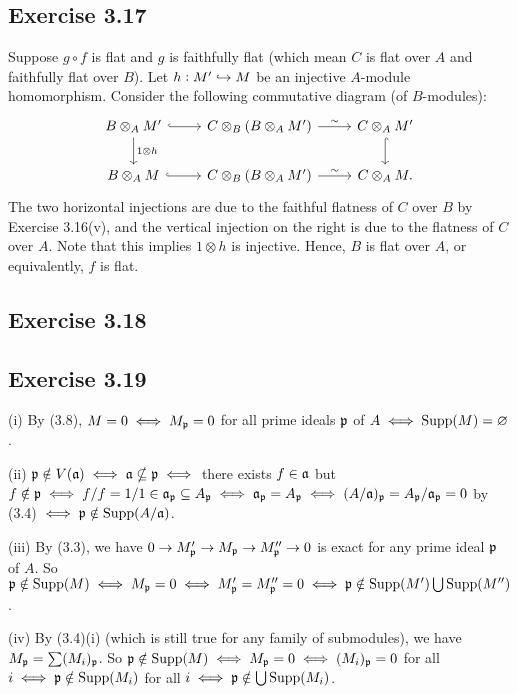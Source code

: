 \documentclass[../A&M.tex]{subfiles}
\begin{document}
\subsection*{Exercise 3.17}

Suppose $g\circ f$ is flat and $g$ is faithfully flat (which mean $C$ is flat over $A$ and faithfully flat over $B$). Let $h: M' \hookrightarrow M$ be an injective $A$-module homomorphism. Consider the following commutative diagram (of $B$-modules):
$$
\begin{tikzcd}
B \otimes_A M' \arrow[r, hook] \arrow[d, "1 \otimes h"] & C \otimes_B (B\otimes_A M') \hisoarrow{r} & C \otimes_A M' \arrow[d, hook] \\ 
B \otimes_A M \arrow[r, hook] & C \otimes_B (B\otimes_A M') \hisoarrow{r} & C \otimes_A M.
\end{tikzcd}
$$
The two horizontal injections are due to the faithful flatness of $C$ over $B$ by Exercise 3.16(v), and the vertical injection on the right is due to the flatness of $C$ over $A$. Note that this implies $1\otimes h$ is injective. Hence, $B$ is flat over $A$, or equivalently, $f$ is flat.

\subsection*{Exercise 3.18}

\subsection*{Exercise 3.19}

(i) By (3.8), $M=0 \iff M_{\mathfrak{p}} = 0$ for all prime ideals $\mathfrak{p}$ of $A \iff \operatorname{Supp}(M) = \varnothing$.

(ii) $\mathfrak{p} \notin V(\mathfrak{a}) \iff \mathfrak{a} \nsubseteq \mathfrak{p} \iff$ there exists $f \in \mathfrak{a}$ but $f \notin \mathfrak{p} \iff f/f = 1/1 \in \mathfrak{a}_{\mathfrak{p}} \subseteq A_{\mathfrak{p}}\iff \mathfrak{a}_{\mathfrak{p}} = A_{\mathfrak{p}} \iff (A/\mathfrak{a})_{\mathfrak{p}} = A_{\mathfrak{p}}/\mathfrak{a}_{\mathfrak{p}} = 0$ by (3.4) $\iff \mathfrak{p} \notin \operatorname{Supp}(A/\mathfrak{a})$.

(iii) By (3.3), we have $0 \to M'_{\mathfrak{p}} \to M_{\mathfrak{p}} \to M''_{\mathfrak{p}} \to 0$ is exact for any prime ideal $\mathfrak{p}$ of $A$. So $\mathfrak{p} \notin \operatorname{Supp}(M) \iff M_{\mathfrak{p}}=0 \iff M'_{\mathfrak{p}} = M''_{\mathfrak{p}} = 0 \iff \mathfrak{p} \notin \operatorname{Supp}(M') \bigcup \operatorname{Supp}(M'')$.

(iv) By (3.4)(i) (which is still true for any family of submodules), we have $M_{\mathfrak{p}} = \sum (M_i)_{\mathfrak{p}}$. So $\mathfrak{p} \notin \operatorname{Supp}(M) \iff M_{\mathfrak{p}} = 0 \iff (M_i)_{\mathfrak{p}} = 0$ for all $i \iff \mathfrak{p} \notin \operatorname{Supp}(M_i)$ for all $i \iff \mathfrak{p} \notin \bigcup \operatorname{Supp}(M_i)$.
\end{document}
